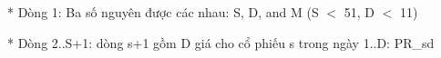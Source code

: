 * Dòng 1: Ba số nguyên được các nhau: S, D, and M (S $<$ 51, D $<$ 11)  

   * Dòng 2..S+1: dòng s+1 gồm D giá cho cổ phiếu s trong ngày 1..D: PR\_sd  

\